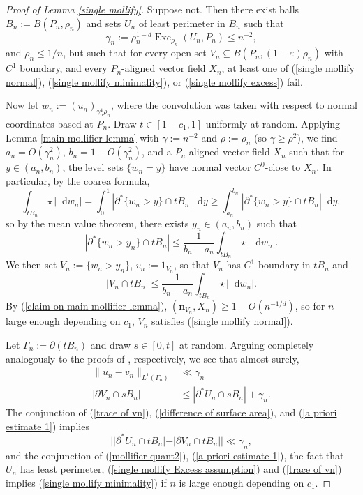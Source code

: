 \documentclass[reqno,11pt]{amsart}
\DeclareMathOperator{\Exc}{Exc}
\newcommand*\dif{\mathop{}\!\mathrm{d}}
\newcommand{\normal}{\mathbf n}
\theoremstyle{definition}
\numberwithin{equation}{section}
\begin{document}
\begin{proof}[Proof of Lemma \ref{single mollify}]
Suppose not.
Then there exist balls $B_n := B(P_n, \rho_n)$ and sets $U_n$ of least perimeter in $B_n$ such that
\begin{equation}\label{single mollify Excess assumption}
\gamma_n := \rho_n^{1 - d} \Exc_{\rho_n} (U_n, P_n) \leq n^{-2},
\end{equation}
and $\rho_n \leq 1/n$, but such that for every open set $V_n \subseteq B(P_n, (1 - \varepsilon) \rho_n)$ with $C^1$ boundary, and every $P_n$-aligned vector field $X_n$, at least one of (\ref{single mollify normal}), (\ref{single mollify minimality}), or (\ref{single mollify excess}) fail.

Now let $w_n := (u_n)_{\gamma_n^4 \rho_n}$, where the convolution was taken with respect to normal coordinates based at $P_n$.
Draw $t \in [1 - c_1, 1]$ uniformly at random.
Applying Lemma \ref{main mollifier lemma} with $\gamma := n^{-2}$ and $\rho := \rho_n$ (so $\gamma \geq \rho^2$), we find $a_n = O(\gamma_n^2)$, $b_n = 1 - O(\gamma_n^2)$, and a $P_n$-aligned vector field $X_n$ such that for $y \in (a_n, b_n)$, the level sets $\{w_n = y\}$ have normal vector $C^0$-close to $X_n$.
In particular, by the coarea formula,
$$\int_{tB_n} \star |\dif w_n| = \int_0^1 |\partial^* \{w_n > y\} \cap tB_n| \dif y \geq \int_{a_n}^{b_n} |\partial^* \{w_n > y\} \cap tB_n| \dif y,$$
so by the mean value theorem, there exists $y_n \in (a_n, b_n)$ such that
$$|\partial^* \{w_n > y_n\} \cap tB_n| \leq \frac{1}{b_n - a_n} \int_{tB_n} \star |\dif w_n|.$$
We then set $V_n := \{w_n > y_n\}$, $v_n := 1_{V_n}$, so that $V_n$ has $C^1$ boundary in $tB_n$ and
\begin{equation}\label{MVT mollifier}
|V_n \cap tB_n| \leq \frac{1}{b_n - a_n} \int_{tB_n} \star |\dif w_n|.
\end{equation}
By (\ref{claim on main mollifier lemma}), $(\normal_{V_n}, X_n) \geq 1 - O(n^{-1/d})$, so for $n$ large enough depending on $c_1$, $V_n$ satisfies (\ref{single mollify normal}).

Let $\Gamma_n := \partial(tB_n)$ and draw $s \in [0, t]$ at random.
Arguing completely analogously to the proofs of \cite[(7.23), (7.22)]{Giusti77}, respectively, we see that almost surely,
\begin{align}
\|u_n - v_n\|_{L^1(\Gamma_n)} &\ll \gamma_n \label{trace of vn} \\
|\partial V_n \cap sB_n| &\leq |\partial^* U_n \cap sB_n| + \gamma_n. \label{difference of surface area}
\end{align}
The conjunction of (\ref{trace of vn}), (\ref{difference of surface area}), and (\ref{a priori estimate 1}) implies
\begin{equation}
||\partial^* U_n \cap tB_n| - |\partial V_n \cap tB_n|| \ll \gamma_n, \label{mollifier quant2}
\end{equation}
and the conjunction of (\ref{mollifier quant2}), (\ref{a priori estimate 1}), the fact that $U_n$ has least perimeter, (\ref{single mollify Excess assumption}) and (\ref{trace of vn}) implies (\ref{single mollify minimality}) if $n$ is large enough depending on $c_1$.


\end{proof}
\end{document}
